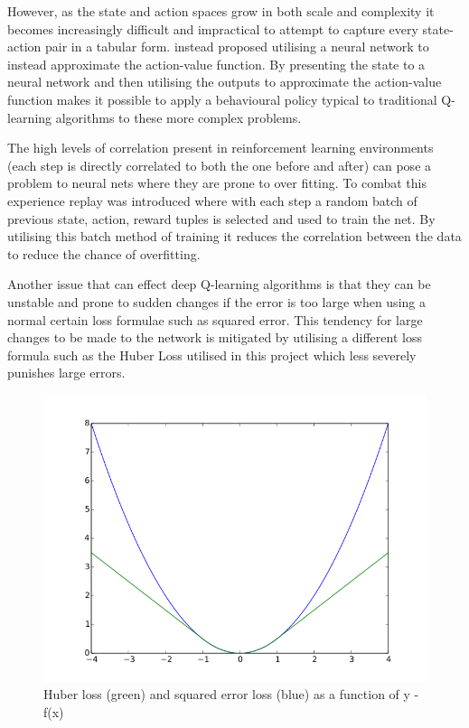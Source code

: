 \documentclass{article}
\begin{document}
However, as the state and action spaces grow in both scale and complexity it becomes increasingly difficult and impractical to attempt to capture every state-action pair in a tabular form.
\citet{Mnih2015} instead proposed utilising a neural network to instead approximate the action-value function.
By presenting the state to a neural network and then utilising the outputs to approximate the action-value function makes it possible to apply a behavioural policy typical to traditional Q-learning algorithms to these more complex problems.

The high levels of correlation present in reinforcement learning environments (each step is directly correlated to both the one before and after) can pose a problem to neural nets where they are prone to over fitting.
To combat this experience replay was introduced where with each step a random batch of previous state, action, reward tuples is selected and used to train the net.
By utilising this batch method of training it reduces the correlation between the data to reduce the chance of overfitting.

Another issue that can effect deep Q-learning algorithms is that they can be unstable and prone to sudden changes if the error is too large when using a normal certain loss formulae such as squared error.
This tendency for large changes to be made to the network is mitigated by utilising a different loss formula such as the Huber Loss utilised in this project which less severely punishes large errors.

\begin{figure}[!ht]
  \centering
  \includegraphics[scale=0.3]{Huber_loss.png}
  \caption{Huber loss (green) and squared error loss (blue) as a function of y - f(x) \citep{huber_loss_dia}}
  \label{fig:huber-loss}
\end{figure}
\end{document}
